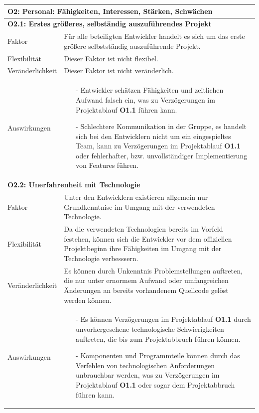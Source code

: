 \documentclass[fontsize=12pt,paper=a4,twoside]{scrartcl}
\begin{document}
\begin{tabularx}{\textwidth}{|l|X|}
\hline
\multicolumn{2}{|l|}{\textbf{O2: Personal: Fähigkeiten, Interessen, Stärken, Schwächen}}\\\hline
\multicolumn{2}{|l|}{\textbf{O2.1: Erstes größeres, selbständig auszuführendes Projekt}}\\\hline
 Faktor & Für alle beteiligten Entwickler handelt es sich um das erste größere selbstständig auszuführende Projekt.\\\hline
 Flexibilität & Dieser Faktor ist nicht flexibel.\\\hline
 Veränderlichkeit & Dieser Faktor ist nicht veränderlich.\\\hline
 Auswirkungen & \begin{itemize} \item[-] Entwickler schätzen Fähigkeiten und zeitlichen Aufwand falsch ein, was zu Verzögerungen im Projektablauf \textbf{O1.1} führen kann. \item[-] Schlechtere Kommunikation in der Gruppe, es handelt sich bei den Entwicklern nicht um ein eingespieltes Team, kann zu Verzögerungen im Projektablauf \textbf{O1.1} oder fehlerhafter, bzw. unvollständiger Implementierung von Features führen.  \end{itemize}
 \\\hline
\multicolumn{2}{|l|}{\textbf{O2.2: Unerfahrenheit mit Technologie}}\\\hline
 Faktor & Unter den Entwicklern existieren allgemein nur Grundkenntnise im Umgang mit der verwendeten Technologie.\\\hline
 Flexibilität & Da die verwendeten Technologien bereits im Vorfeld festehen, können sich die Entwickler vor dem offiziellen Projektbeginn ihre Fähigkeiten im Umgang mit der Technologie verbesssern.\\\hline
 Veränderlichkeit & Es können durch Unkenntnis Problemstellungen auftreten, die nur unter ernormem Aufwand oder umfangreichen Änderungen an bereits vorhandenem Quellcode gelöst werden können.\\\hline
 Auswirkungen & \begin{itemize} \item[-] Es können Verzögerungen im Projektablauf \textbf{O1.1} durch unvorhergesehene technologische Schwierigkeiten auftreten, die bis zum Projektabbruch führen können. \item[-] Komponenten und Programmteile können durch das Verfehlen von technologischen Anforderungen unbrauchbar werden, was zu Verzögerungen im Projektablauf \textbf{O1.1} oder sogar dem Projektabbruch führen kann. \end{itemize} \\\hline
\end{tabularx} 
\end{document}
